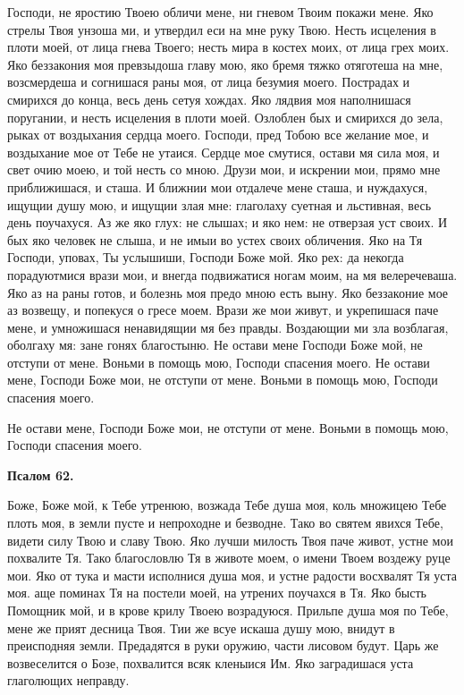 Господи, не яростию Твоею обличи мене, ни гневом Твоим покажи мене. Яко стрелы Твоя унзоша ми, и утвердил еси на мне руку Твою. Несть исцеления в плоти моей, от лица гнева Твоего; несть мира в костех моих, от лица грех моих. Яко беззакония моя превзыдоша главу мою, яко бремя тяжко отяготеша на мне, возсмердеша и согнишася раны моя, от лица безумия моего. Пострадах и смирихся до конца, весь день сетуя хождах. Яко лядвия моя наполнишася поругании, и несть исцеления в плоти моей. Озлоблен бых и смирихся до зела, рыках от воздыхания сердца моего. Господи, пред Тобою все желание мое, и воздыхание мое от Тебе не утаися. Сердце мое смутися, остави мя сила моя, и свет очию моею, и той несть со мною. Друзи мои, и искрении мои, прямо мне приближишася, и сташа. И ближнии мои отдалече мене сташа, и нуждахуся, ищущии душу мою, и ищущии злая мне: глаголаху суетная и льстивная, весь день поучахуся. Аз же яко глух: не слышах; и яко нем: не отверзая уст своих. И бых яко человек не слыша, и не имыи во устех своих обличения. Яко на Тя Господи, уповах, Ты услышиши, Господи Боже мой. Яко рех: да некогда порадуютмися врази мои, и внегда подвижатися ногам моим, на мя велеречеваша. Яко аз на раны готов, и болезнь моя предо мною есть выну. Яко беззаконие мое аз возвещу, и попекуся о гресе моем. Врази же мои живут, и укрепишася паче мене, и умножишася ненавидящии мя без правды. Воздающии ми зла возблагая, оболгаху мя: зане гонях благостыню. Не остави мене Господи Боже мой, не отступи от мене. Воньми в помощь мою, Господи спасения моего. Не остави мене, Господи Боже мои, не отступи от мене. Воньми в помощь мою, Господи спасения моего.

Не остави мене, Господи Боже мои, не отступи от мене. Воньми в помощь мою, Господи спасения моего.


\medskip


\bfseries Псалом 62.\normalfont{}


Боже, Боже мой, к Тебе утренюю, возжада Тебе душа моя, коль множицею Тебе плоть моя, в земли пусте и непроходне и безводне. Тако во святем явихся Тебе, видети силу Твою и славу Твою. Яко лучши милость Твоя паче живот, устне мои похвалите Тя. Тако благословлю Тя в животе моем, о имени Твоем воздежу руце мои. Яко от тука и масти исполнися душа моя, и устне радости восхвалят Тя уста моя. аще поминах Тя на постели моей, на утрених поучахся в Тя. Яко бысть Помощник мой, и в крове крилу Твоею возрадуюся. Прильпе душа моя по Тебе, мене же прият десница Твоя. Тии же всуе искаша душу мою, внидут в преисподняя земли. Предадятся в руки оружию, части лисовом будут. Царь же возвеселится о Бозе, похвалится всяк кленыися Им. Яко заградишася уста глаголющих неправду.


